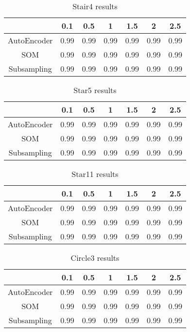 \begin{table}[h]
    \centering
    \def\arraystretch{1.5}
    \begin{tabular}{|| c | c | c | c | c | c | c ||}
    \hline
         & 0.1 & 0.5 & 1 & 1.5 & 2 & 2.5  \\
    \hline \hline
    AutoEncoder & 0.99 & 0.99 & 0.99 & 0.99 & 0.99 & 0.99 \\ \hline
    SOM & 0.99 & 0.99 & 0.99 & 0.99 & 0.99 & 0.99 \\ \hline
    Subsampling & 0.99 & 0.99 & 0.99 & 0.99 & 0.99 & 0.99 \\ \hline
    \end{tabular}
    \caption{Stair4 results}
    \label{tab:stair4_res}
\end{table}

\begin{table}[h]
    \centering
    \def\arraystretch{1.5}
    \begin{tabular}{|| c | c | c | c | c | c | c ||}
    \hline
         & 0.1 & 0.5 & 1 & 1.5 & 2 & 2.5  \\
    \hline \hline
    AutoEncoder & 0.99 & 0.99 & 0.99 & 0.99 & 0.99 & 0.99 \\ \hline
    SOM & 0.99 & 0.99 & 0.99 & 0.99 & 0.99 & 0.99 \\ \hline
    Subsampling & 0.99 & 0.99 & 0.99 & 0.99 & 0.99 & 0.99 \\ \hline
    \end{tabular}
    \caption{Star5 results}
    \label{tab:star5_res}
\end{table}

\begin{table}[h]
    \centering
    \def\arraystretch{1.5}
    \begin{tabular}{|| c | c | c | c | c | c | c ||}
    \hline
         & 0.1 & 0.5 & 1 & 1.5 & 2 & 2.5  \\
    \hline \hline
    AutoEncoder & 0.99 & 0.99 & 0.99 & 0.99 & 0.99 & 0.99 \\ \hline
    SOM & 0.99 & 0.99 & 0.99 & 0.99 & 0.99 & 0.99 \\ \hline
    Subsampling & 0.99 & 0.99 & 0.99 & 0.99 & 0.99 & 0.99 \\ \hline
    \end{tabular}
    \caption{Star11 results}
    \label{tab:star11_res}
\end{table}

\begin{table}[h]
    \centering
    \def\arraystretch{1.5}
    \begin{tabular}{|| c | c | c | c | c | c | c ||}
    \hline
         & 0.1 & 0.5 & 1 & 1.5 & 2 & 2.5  \\
    \hline \hline
    AutoEncoder & 0.99 & 0.99 & 0.99 & 0.99 & 0.99 & 0.99 \\ \hline
    SOM & 0.99 & 0.99 & 0.99 & 0.99 & 0.99 & 0.99 \\ \hline
    Subsampling & 0.99 & 0.99 & 0.99 & 0.99 & 0.99 & 0.99 \\ \hline
    \end{tabular}
    \caption{Circle3 results}
    \label{tab:circle3_res}
\end{table}

